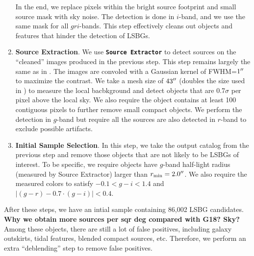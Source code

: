 \documentclass[twocolumn,astrosymb,twocolappendix]{aastex631}
\newcommand{\code}[1]{\textbf{\texttt{#1}}}
\begin{document}
\begin{CJK*}{UTF8}{gbsn}
\begin{enumerate}
    In the end, we replace pixels within the bright source footprint and small source mask with sky noise. The detection is done in $i$-band, and we use the same mask for all $gri$-bands. This step effectively cleans out objects and features that hinder the detection of LSBGs. 
    
    \item \textbf{Source Extraction}. We use \code{Source Extractor} \citep{Bertin1996} to detect sources on the ``cleaned'' images produced in the previous step. This step remains largely the same as in . The images are convoled with a Gaussian kernel of FWHM=$1\mbox{$^{\prime\prime}$}$ to maximize the contrast. We take a mesh size of $43\mbox{$^{\prime\prime}$}$ (doubles the size used in ) to measure the local bacbkground and detect objects that are 0.7$\sigma$ per pixel above the local sky. We also require the object contains at least 100 contiguous pixels to further remove small compact objects. We perform the detection in $g$-band but require all the sources are also detected in $r$-band to exclude possible artifacts. 
    
    \item \textbf{Initial Sample Selection}. In this step, we take the output catalog from the previous step and remove those objects that are not likely to be LSBGs of interest. To be specific, we require objects have $g$-band half-light radius (measured by Source Extractor) larger than $r_{\rm min} = 2.0\mbox{$^{\prime\prime}$}$. We also require the measured colors to satisfy $-0.1 < g-i < 1.4$ and $|(g-r) - 0.7\cdot (g-i)| < 0.4$. %
    
    
\end{enumerate}
After these steps, we have an intial sample containing 86,002 LSBG candidates. \textbf{Why we obtain more sources per sqr deg compared with G18? Sky?} Among these objects, there are still a lot of false positives, including galaxy outskirts, tidal features, blended compact sources, etc. Therefore, we perform an extra ``deblending'' step to remove false positives.  



\end{CJK*}
\end{document}
